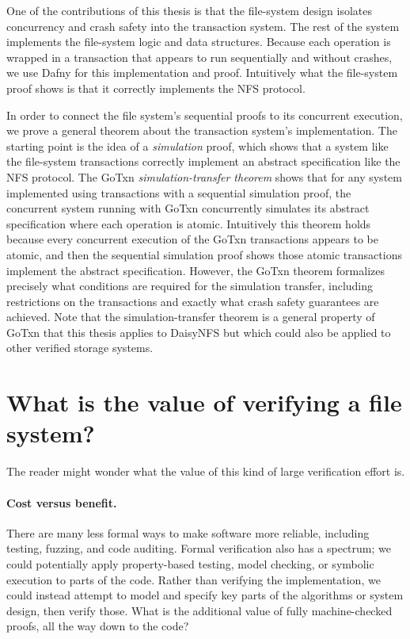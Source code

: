 One of the contributions of this thesis is that the file-system design isolates
concurrency and crash safety into the transaction system. The rest of the system
implements the file-system logic and data structures. Because each operation is
wrapped in a transaction that appears to run sequentially and without crashes,
we use Dafny for this implementation and proof. Intuitively what the file-system
proof shows is that it correctly implements the NFS protocol.

In order to connect the file system's sequential proofs to its concurrent
execution, we prove a general theorem about the transaction system's
implementation. The starting point is the idea of a \emph{simulation} proof,
which shows that a system like the file-system transactions correctly implement an
abstract specification like the NFS protocol. The GoTxn
\emph{simulation-transfer theorem} shows that for any system implemented using
transactions with a sequential simulation proof, the concurrent system running
with GoTxn concurrently simulates its abstract specification where each
operation is atomic. Intuitively this theorem holds because every concurrent
execution of the GoTxn transactions appears to be atomic, and then the
sequential simulation proof shows those atomic transactions implement the
abstract specification. However, the GoTxn theorem formalizes precisely what
conditions are required for the simulation transfer, including restrictions on
the transactions and exactly what crash safety guarantees are achieved. Note
that the simulation-transfer theorem is a general property of GoTxn that this
thesis applies to DaisyNFS but which could also be applied to other verified
storage systems.

\section{What is the value of verifying a file system?}

The reader might wonder what the value of this kind of large verification effort
is.

\paragraph{Cost versus benefit.} There are many less formal ways to make
software more reliable, including testing, fuzzing, and code auditing. Formal
verification also has a spectrum; we could potentially apply property-based
testing, model checking, or symbolic execution to parts of the code. Rather than
verifying the implementation, we could instead attempt to model and specify key
parts of the algorithms or system design, then verify those. What is the
additional value of fully machine-checked proofs, all the way down to the code?


